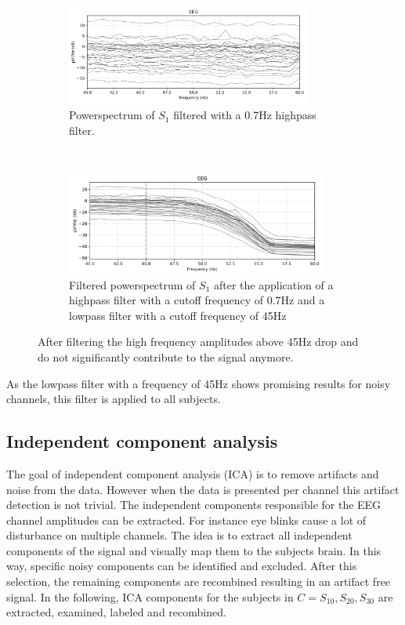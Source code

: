 \documentclass[a4paper]{article}
\begin{document}
\begin{figure}[tbh!] 
\centering
 \begin{subfigure}[t]{0.5\textwidth}
        \centering
        \includegraphics[height=1.3in]{lowpassBefore.png}
\caption{Powerspectrum of $S_1$ filtered with a 0.7Hz highpass filter.}
\end{subfigure}%
    ~ 
\begin{subfigure}[t]{0.5\textwidth}
        \centering
        \includegraphics[height=1.3in]{lowpassAfter.png}
        \caption{Filtered powerspectrum of $S_1$ after the application of a highpass filter with a cutoff frequency of 0.7Hz and a lowpass filter with a cutoff frequency of 45Hz}
\end{subfigure}
    \caption{After filtering the high frequency amplitudes above 45Hz drop and do not significantly contribute to the signal anymore.}
    \label{fig:filteringLowpassComparisonApplied}
\end{figure}

As the lowpass filter with a frequency of 45Hz shows promising results for noisy channels, this filter is applied to all subjects.
\FloatBarrier



\subsection{Independent component analysis}
The goal of independent component analysis (ICA) is to remove artifacts and noise from the data.
However when the data is presented per channel this artifact detection is not trivial.
The independent components responsible for the EEG channel amplitudes can be extracted.
For instance eye blinks cause a lot of disturbance on multiple channels.
The idea is to extract all independent components of the signal and visually map them to the subjects brain.
In this way, specific noisy components can be identified and excluded.
After this selection, the remaining components are recombined resulting in an artifact free signal.
In the following, ICA components for the subjects in $C = {S_{10}, S_{20}, S_{30}}$ are extracted, examined, labeled and recombined.
\end{document}
